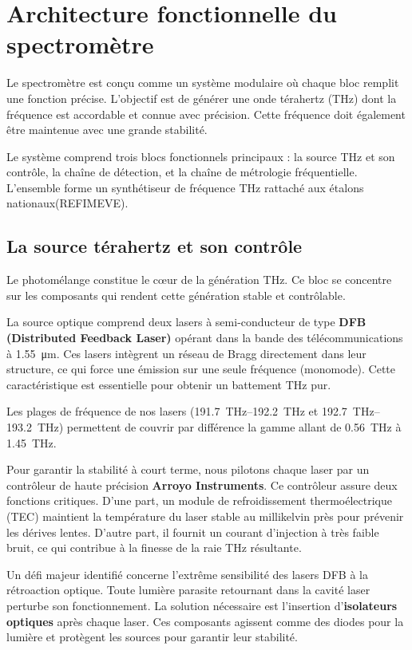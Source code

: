 \section{Architecture fonctionnelle du spectromètre}
\label{sec:architecture}

Le spectromètre est conçu comme un système modulaire où chaque bloc remplit une fonction précise. L'objectif est de générer une onde térahertz (THz) dont la fréquence est accordable et connue avec précision. Cette fréquence doit également être maintenue avec une grande stabilité.

Le système comprend trois blocs fonctionnels principaux : la source THz et son contrôle, la chaîne de détection, et la chaîne de métrologie fréquentielle. L'ensemble forme un synthétiseur de fréquence THz rattaché aux étalons nationaux(REFIMEVE).

\subsection{La source térahertz et son contrôle}

Le photomélange constitue le cœur de la génération THz. Ce bloc se concentre sur les composants qui rendent cette génération stable et contrôlable. 

La source optique comprend deux lasers à semi-conducteur de type \textbf{DFB (Distributed Feedback Laser)} opérant dans la bande des télécommunications à \SI{1,55}{\micro\meter}. Ces lasers intègrent un réseau de Bragg directement dans leur structure, ce qui force une émission sur une seule fréquence (monomode). Cette caractéristique est essentielle pour obtenir un battement THz pur.

Les plages de fréquence de nos lasers (\SIrange{191,7}{192,2}{\THz} et \SIrange{192,7}{193,2}{\THz}) permettent de couvrir par différence la gamme allant de \SI{0,56}{\THz} à \SI{1,45}{\THz}.

Pour garantir la stabilité à court terme, nous pilotons chaque laser par un contrôleur de haute précision \textbf{Arroyo Instruments}. Ce contrôleur assure deux fonctions critiques. D'une part, un module de refroidissement thermoélectrique (TEC) maintient la température du laser stable au millikelvin près pour prévenir les dérives lentes. D'autre part, il fournit un courant d'injection à très faible bruit, ce qui contribue à la finesse de la raie THz résultante.

Un défi majeur identifié concerne l'extrême sensibilité des lasers DFB à la rétroaction optique. Toute lumière parasite retournant dans la cavité laser perturbe son fonctionnement. La solution nécessaire est l'insertion d'\textbf{isolateurs optiques} après chaque laser. Ces composants agissent comme des diodes pour la lumière et protègent les sources pour garantir leur stabilité.


